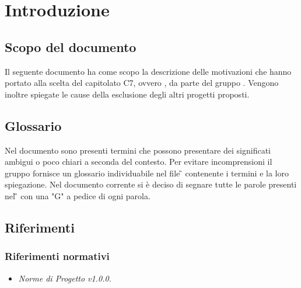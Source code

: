 \section{Introduzione}

\subsection{Scopo del documento}
Il seguente documento ha come scopo la descrizione delle motivazioni che hanno
portato alla scelta del capitolato C7, ovvero \progetto{}, da parte del gruppo \gruppo{}. Vengono inoltre spiegate le cause della esclusione degli altri progetti proposti.

\subsection{Glossario}
Nel documento sono presenti termini che possono presentare dei significati ambigui o poco chiari a seconda del contesto.
Per evitare incomprensioni il gruppo fornisce un glossario individuabile nel file \G{} \versGlo{} contenente i termini e la loro spiegazione.\newline{}
Nel documento corrente si è deciso di segnare tutte le parole presenti nel \G{} con una "G" a pedice di ogni parola.

\subsection{Riferimenti}

\subsubsection{Riferimenti normativi}
\begin{itemize}
\item \textit{Norme di Progetto v1.0.0.}
\end{itemize}

